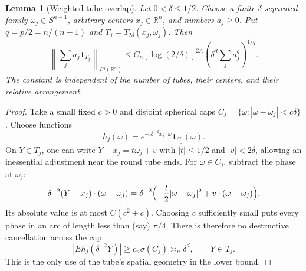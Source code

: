 \documentclass[11pt,a4paper]{article}
\numberwithin{equation}{section}
\newtheorem{lemma}[theorem]{Lemma}
\theoremstyle{definition}
\theoremstyle{remark}
\newcommand{\R}{\mathbb R}
\newcommand{\one}{\mathbf 1}
\newcommand{\Sph}{S^{n-1}}
\begin{document}
\begin{lemma}[Weighted tube overlap]
\label{lem:overlap}
Let $0<\delta\le1/2$. Choose a finite $\delta$-separated family
$\omega_j\in\Sph$, arbitrary centers $x_j\in\R^n$, and numbers
$a_j\ge0$. Put $q=p/2=n/(n-1)$ and
$T_j=T_{2\delta}(x_j,\omega_j)$. Then
\begin{equation}\label{eq:overlap}
 \left\|\sum_j a_j\one_{T_j}\right\|_{L^q(\R^n)}
 \le C_n[\log(2/\delta)]^{2A}
           \left(\delta^d\sum_j a_j^q\right)^{1/q}.
\end{equation}
The constant is independent of the number of tubes, their centers,
and their relative arrangement.
\end{lemma}
\begin{proof}
Take a small fixed $c>0$ and disjoint spherical caps
$C_j=\{\omega:|\omega-\omega_j|<c\delta\}$.
Choose functions
\[
 h_j(\omega)=e^{-\mathrm i\delta^{-2}x_j\cdot\omega}
                \one_{C_j}(\omega).
\]
On $Y\in T_j$, one can write
$Y-x_j=t\omega_j+v$ with $|t|\le1/2$ and $|v|<2\delta$,
allowing an inessential adjustment near the round tube ends.
For $\omega\in C_j$, subtract the phase at $\omega_j$:
\[
 \delta^{-2}(Y-x_j)\cdot(\omega-\omega_j)
 =\delta^{-2}\Bigl(-\frac t2|\omega-\omega_j|^2
                          +v\cdot(\omega-\omega_j)\Bigr).
\]
Its absolute value is at most $C(c^2+c)$. Choosing $c$ sufficiently
small puts every phase in an arc of length less than (say) $\pi/4$.
There is therefore no destructive cancellation across the cap:
\begin{equation}\label{eq:caplower}
 |Eh_j(\delta^{-2}Y)|\ge c_n\sigma(C_j)
       \asymp_n\delta^d,\qquad Y\in T_j.
\end{equation}
This is the only use of the tube's spatial geometry in the lower bound.


\end{proof}
\end{document}
